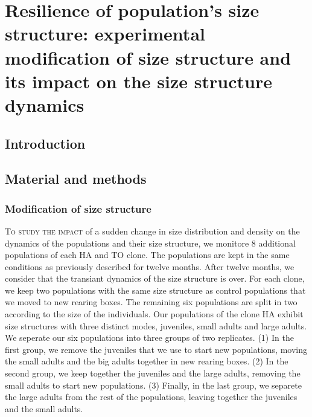 \chapter{Resilience of population's size structure: experimental modification of
size structure and its impact on the size structure dynamics}

\section{Introduction}

\section{Material and methods}
\subsection{Modification of size structure}

\lettrine[lines=3]{T}{o study the impact} of a sudden change in size
distribution and density on the dynamics of the populations and their size structure, we monitore 8 additional
populations of each HA and TO clone. The populations are kept in the same
conditions as previously described for twelve months. After twelve months, we
consider that the transiant dynamics of the size structure is over. For each
clone, we keep two populations with the same size structure as control
populations that we moved to new rearing boxes. The remaining six populations
are split in two according to the size of the individuals.
Our populations of the clone HA exhibit size structures with three distinct
modes, juveniles, small adults and large adults. We seperate our six populations
into three groups of two replicates. (1) In the first group, we remove the
juveniles that we use to start new populations, moving the small adults and the
big adults together in new rearing boxes. (2) In the second group, we keep
together the juveniles and the large adults, removing the small adults to start
new populations. (3) Finally, in the last group, we separete the large adults
from the rest of the populations, leaving together the juveniles and the small
adults.

